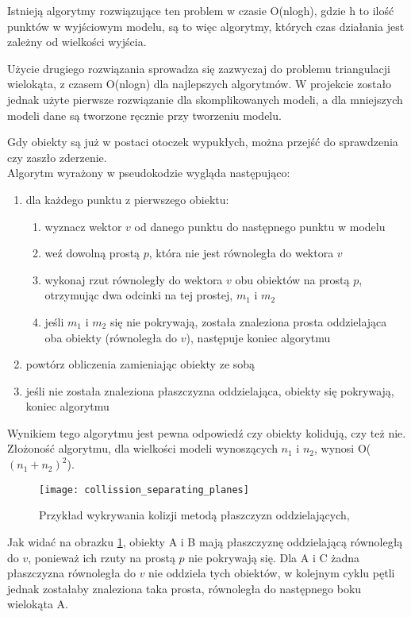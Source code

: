 Istnieją algorytmy rozwiązujące ten problem w czasie O(nlogh), gdzie h to ilo\'sć punktów w wyj\'sciowym modelu, są to więc algorytmy, których czas działania jest zależny od wielko\'sci wyj\'scia.\bigskip

Użycie drugiego rozwiązania sprowadza się zazwyczaj do problemu triangulacji wielokąta, z czasem O(nlogn) dla najlepszych algorytmów. W projekcie zostało jednak użyte pierwsze rozwiązanie dla skomplikowanych modeli, a dla mniejszych modeli dane są tworzone ręcznie przy tworzeniu modelu.\bigskip

\smallskip

\noindent Gdy obiekty są już w postaci otoczek wypukłych, można przej\'sć do sprawdzenia czy zaszło zderzenie.\\
Algorytm wyrażony w pseudokodzie wygląda następująco:\begin{enumerate}
	\item dla każdego punktu z pierwszego obiektu:\begin{enumerate}
		\item wyznacz wektor $v$ od danego punktu do następnego punktu w modelu
		\item weź dowolną prostą $p$, która nie jest równoległa do wektora $v$
		\item wykonaj rzut równoległy do wektora $v$ obu obiektów na prostą $p$, otrzymując dwa odcinki na tej prostej, $m_1$ i $m_2$
		\item je\'sli $m_1$ i $m_2$ się nie pokrywają, została znaleziona prosta oddzielająca oba obiekty (równoległa do $v$), następuje koniec algorytmu
	\end{enumerate}
	\item powtórz obliczenia zamieniając obiekty ze sobą
	\item je\'sli nie została znaleziona płaszczyzna oddzielająca, obiekty się pokrywają, koniec algorytmu
\end{enumerate}\bigskip

\noindent Wynikiem tego algorytmu jest pewna odpowiedź czy obiekty kolidują, czy też nie.\\
Złożono\'sć algorytmu, dla wielko\'sci modeli wynoszących $n_1$ i $n_2$, wynosi O($(n_1+n_2)^2$).\newpage

\begin{figure}[h]
	\centering
	\noindent\texttt{[image: collission\_separating\_planes]}
	\caption{Przykład wykrywania kolizji metodą płaszczyzn oddzielających, }
	\label{separating_planes}
\end{figure}

Jak widać na obrazku \ref{separating_planes}, obiekty A i B mają płaszczyznę oddzielającą równoległą do $v$, ponieważ ich rzuty na prostą $p$ nie pokrywają się. Dla A i C żadna płaszczyzna równoległa do $v$ nie oddziela tych obiektów, w kolejnym cyklu pętli jednak zostałaby znaleziona taka prosta, równoległa do następnego boku wielokąta A.
